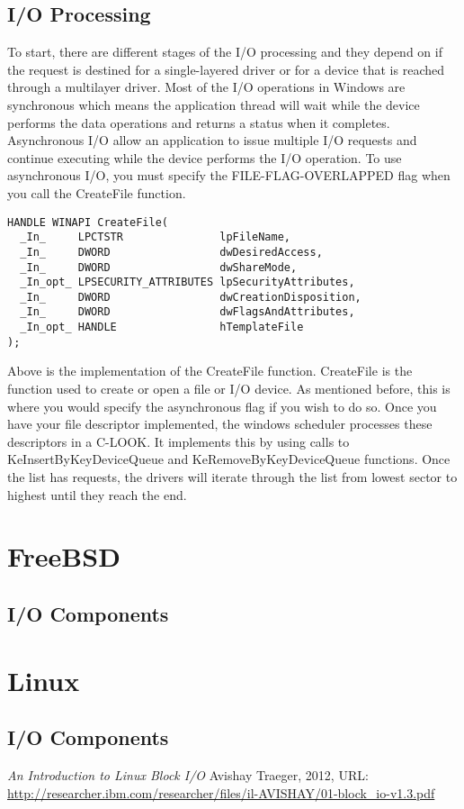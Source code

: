 \documentclass[letterpaper,draftclsnofoot,10pt,onecolumn,titlepage]{IEEEtran}\usepackage[margin=0.75in]{geometry}
\begin{document}
\subsection{I/O Processing}
To start, there are different stages of the I/O processing and they depend on if the request is destined 
for a single-layered driver or for a device that is reached through a multilayer driver. Most of the I/O 
operations in Windows are synchronous which means the application thread will wait while the device performs 
the data operations and returns a status when it completes. \cite{Windows} Asynchronous I/O allow an application 
to issue multiple I/O requests and continue executing while the device performs the I/O operation. To use 
asynchronous I/O, you must specify the FILE-FLAG-OVERLAPPED flag when you call the CreateFile function.

\begin{lstlisting}
HANDLE WINAPI CreateFile(
  _In_     LPCTSTR               lpFileName,
  _In_     DWORD                 dwDesiredAccess,
  _In_     DWORD                 dwShareMode,
  _In_opt_ LPSECURITY_ATTRIBUTES lpSecurityAttributes,
  _In_     DWORD                 dwCreationDisposition,
  _In_     DWORD                 dwFlagsAndAttributes,
  _In_opt_ HANDLE                hTemplateFile
); 
\end{lstlisting}

Above is the implementation of the CreateFile function. CreateFile is the function used to create or open 
a file or I/O device. As mentioned before, this is where you would specify the asynchronous flag if you 
wish to do so. Once you have your file descriptor implemented, the windows scheduler processes these 
descriptors in a C-LOOK. It implements this by using calls to KeInsertByKeyDeviceQueue and 
KeRemoveByKeyDeviceQueue functions. Once the list has requests, the drivers will iterate through the list 
from lowest sector to highest until they reach the end. 

\section{FreeBSD}

\subsection{I/O Components}


\section{Linux}

\subsection{I/O Components}


\begin{thebibliography}{1}

    \textit{An Introduction to Linux Block I/O}
    Avishay Traeger, 2012, URL: \url{http://researcher.ibm.com/researcher/files/il-AVISHAY/01-block_io-v1.3.pdf}

\end{thebibliography}
\end{document}
